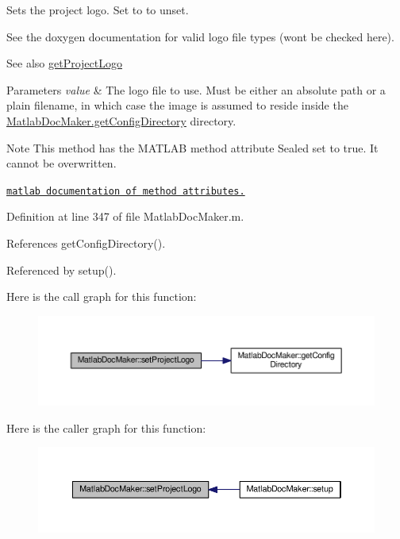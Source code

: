 Sets the project logo. Set to \textquotesingle{} to unset. 

See the doxygen documentation for valid logo file types (wont be checked here).

\begin{DoxySeeAlso}{See also}
\hyperlink{class_matlab_doc_maker_a6767085b13dc2600cb6beda7f7d6acd9}{get\+Project\+Logo}
\end{DoxySeeAlso}

\begin{DoxyParams}{Parameters}
{\em value} & The logo file to use. Must be either an absolute path or a plain filename, in which case the image is assumed to reside inside the \hyperlink{class_matlab_doc_maker_a11a2a8ec616df969a911b325e39b0b4f}{Matlab\+Doc\+Maker.\+get\+Config\+Directory} directory.\\
\hline
\end{DoxyParams}
\begin{DoxyNote}{Note}
This method has the M\+A\+T\+L\+AB method attribute {\ttfamily Sealed} set to true. It cannot be overwritten. 

\href{http://www.mathworks.com/help/matlab/matlab_oop/method-attributes.html}{\tt matlab documentation of method attributes.} 
\end{DoxyNote}


Definition at line 347 of file Matlab\+Doc\+Maker.\+m.



References get\+Config\+Directory().



Referenced by setup().

Here is the call graph for this function\+:
\nopagebreak
\begin{figure}[H]
\begin{center}
\leavevmode
\includegraphics[width=350pt]{class_matlab_doc_maker_a6e84afe2189a851665133b6e7c412d4c_cgraph}
\end{center}
\end{figure}
Here is the caller graph for this function\+:
\nopagebreak
\begin{figure}[H]
\begin{center}
\leavevmode
\includegraphics[width=350pt]{class_matlab_doc_maker_a6e84afe2189a851665133b6e7c412d4c_icgraph}
\end{center}
\end{figure}
